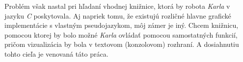 Problém však nastal pri hľadaní vhodnej knižnice, ktorá by robota \emph{Karla} v jazyku \emph{C} poskytovala. Aj napriek tomu, že existujú rozličné hlavne grafické implementácie s vlastným pseudojazykom, môj zámer je iný. Chcem knižnicu, pomocou ktorej by bolo možné \emph{Karla} ovládať pomocou samostatných funkcií, pričom vizualizácia by bola v textovom (konzolovom) rozhraní. A dosiahnutiu tohto cieľa je venovaná táto práca.



